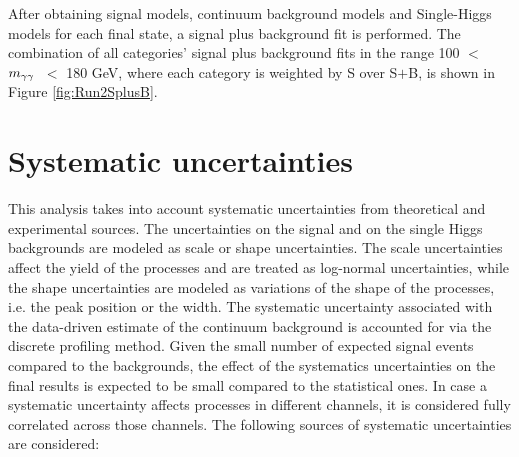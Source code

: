 After obtaining signal models, continuum background models and Single-Higgs models for each final state, a signal plus background fit is performed.
The combination of all categories' signal plus background fits in the range 100 $<$ $m_{\gamma\gamma}\hspace{0.2em}$ $<$ 180 GeV, where each category is weighted by S over S$+$B, is shown in Figure \ref{fig:Run2SplusB}.

\label{fig:Run2SplusB}


\section{Systematic uncertainties} \label{section:Systematics}
This analysis takes into account systematic uncertainties from theoretical and experimental sources. The uncertainties on the signal and on the single Higgs backgrounds are modeled as scale or shape uncertainties. The scale uncertainties affect the yield of the processes and are treated as log-normal uncertainties, while the shape uncertainties are modeled as variations of the \mgg shape of the processes, i.e. the peak position or the width. The systematic uncertainty associated with the data-driven estimate of the continuum background is accounted for via the discrete profiling method. Given the small number of expected signal events compared to the backgrounds, the effect of the systematics uncertainties on the final results is expected to be small compared to the statistical ones. In case a systematic uncertainty affects processes in different channels, it is considered fully correlated across those channels. The following sources of systematic uncertainties are considered:

